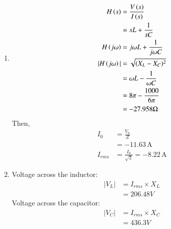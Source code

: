\documentclass[a4,12pt,onecolumn]{IEEEtran}
\begin{document}
\begin{enumerate}
    \item 
    \begin{align}
    H\left(s\right) &=\frac{V\left(s\right)}{I\left(s\right)}\\
    &=sL+\frac{1}{sC}\\
    H\left(j\omega\right) &= j\omega L + \frac{1}{j\omega C}\\
    |H\left(j\omega\right)| &=\sqrt{(X_L - X_C)^2} \\
    &=\omega L - \frac{1}{\omega C} \\
    &= 8\pi - \frac{1000}{6\pi}\\
    &= -27.958\Omega   
    \end{align}
    Then,
    \begin{align}
        I_0 &= \frac{V_0}{Z} \\
        &= -11.63\, \text{A} \\
        I_{rms} &= \frac{I_0}{\sqrt{2}} = -8.22\, \text{A}
    \end{align}
    
    \item Voltage across the inductor:
    \begin{align}
        |V_L| &= I_{rms} \times X_L \\
        &= 206.48V
    \end{align}
    Voltage across the capacitor:
    \begin{align}
       |V_C| &= I_{rms} \times X_C \\
        &= 436.3V
    \end{align}


\end{enumerate}
\end{document}
